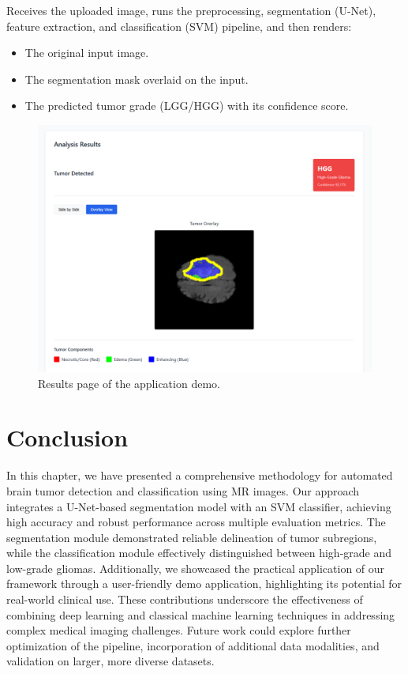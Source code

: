 Receives the uploaded image, runs the preprocessing, segmentation (U-Net), feature extraction, and classification (SVM) pipeline, and then renders:
\begin{itemize}
  \item The original input image.
  \item The segmentation mask overlaid on the input.
  \item The predicted tumor grade (LGG/HGG) with its confidence score.
\end{itemize}
\begin{figure}[H]
  \centering
  \includegraphics[width=1\textwidth]{Images/Chapter3/app_result.png}
  \caption{Results page of the application demo.}
  \label{fig:demo-results}
\end{figure}

\section{Conclusion}
\label{sec:contribution-conclusion}

In this chapter, we have presented a comprehensive methodology for automated brain tumor detection and classification using MR images. Our approach integrates a U-Net-based segmentation model with an SVM classifier, achieving high accuracy and robust performance across multiple evaluation metrics. The segmentation module demonstrated reliable delineation of tumor subregions, while the classification module effectively distinguished between high-grade and low-grade gliomas. Additionally, we showcased the practical application of our framework through a user-friendly demo application, highlighting its potential for real-world clinical use. These contributions underscore the effectiveness of combining deep learning and classical machine learning techniques in addressing complex medical imaging challenges. Future work could explore further optimization of the pipeline, incorporation of additional data modalities, and validation on larger, more diverse datasets.



